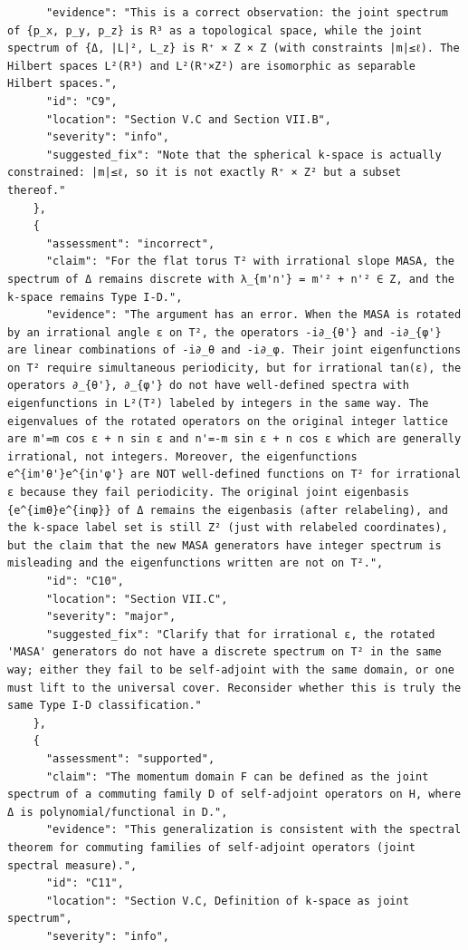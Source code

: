\documentclass[11pt]{article}
\begin{document}
\begin{verbatim}
      "evidence": "This is a correct observation: the joint spectrum of {p_x, p_y, p_z} is R³ as a topological space, while the joint spectrum of {Δ, |L|², L_z} is R⁺ × Z × Z (with constraints |m|≤ℓ). The Hilbert spaces L²(R³) and L²(R⁺×Z²) are isomorphic as separable Hilbert spaces.",
      "id": "C9",
      "location": "Section V.C and Section VII.B",
      "severity": "info",
      "suggested_fix": "Note that the spherical k-space is actually constrained: |m|≤ℓ, so it is not exactly R⁺ × Z² but a subset thereof."
    },
    {
      "assessment": "incorrect",
      "claim": "For the flat torus T² with irrational slope MASA, the spectrum of Δ remains discrete with λ_{m'n'} = m'² + n'² ∈ Z, and the k-space remains Type I-D.",
      "evidence": "The argument has an error. When the MASA is rotated by an irrational angle ε on T², the operators -i∂_{θ'} and -i∂_{φ'} are linear combinations of -i∂_θ and -i∂_φ. Their joint eigenfunctions on T² require simultaneous periodicity, but for irrational tan(ε), the operators ∂_{θ'}, ∂_{φ'} do not have well-defined spectra with eigenfunctions in L²(T²) labeled by integers in the same way. The eigenvalues of the rotated operators on the original integer lattice are m'=m cos ε + n sin ε and n'=-m sin ε + n cos ε which are generally irrational, not integers. Moreover, the eigenfunctions e^{im'θ'}e^{in'φ'} are NOT well-defined functions on T² for irrational ε because they fail periodicity. The original joint eigenbasis {e^{imθ}e^{inφ}} of Δ remains the eigenbasis (after relabeling), and the k-space label set is still Z² (just with relabeled coordinates), but the claim that the new MASA generators have integer spectrum is misleading and the eigenfunctions written are not on T².",
      "id": "C10",
      "location": "Section VII.C",
      "severity": "major",
      "suggested_fix": "Clarify that for irrational ε, the rotated 'MASA' generators do not have a discrete spectrum on T² in the same way; either they fail to be self-adjoint with the same domain, or one must lift to the universal cover. Reconsider whether this is truly the same Type I-D classification."
    },
    {
      "assessment": "supported",
      "claim": "The momentum domain F can be defined as the joint spectrum of a commuting family D of self-adjoint operators on H, where Δ is polynomial/functional in D.",
      "evidence": "This generalization is consistent with the spectral theorem for commuting families of self-adjoint operators (joint spectral measure).",
      "id": "C11",
      "location": "Section V.C, Definition of k-space as joint spectrum",
      "severity": "info",

\end{verbatim}
\end{document}
